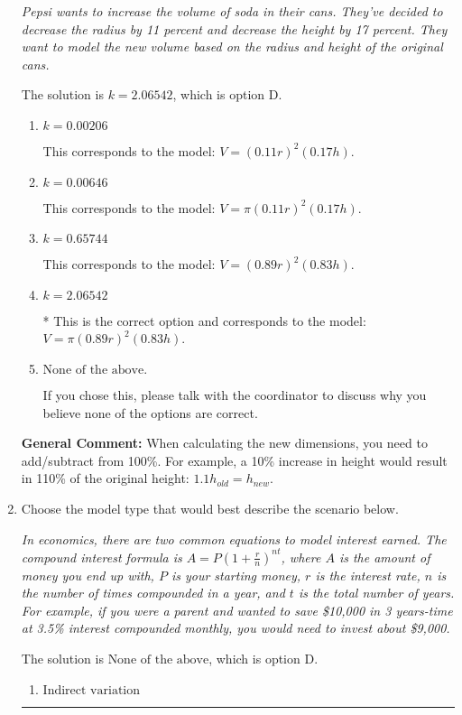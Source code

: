 \documentclass{extbook}[14pt]
\newcommand{\litem}[1]{\item #1

\rule{\textwidth}{0.4pt}}
\begin{document}
\begin{enumerate}
{\begin{center}
    \textit{ Pepsi wants to increase the volume of soda in their cans. They've decided to decrease the radius by 11 percent and decrease the height by 17 percent. They want to model the new volume based on the radius and height of the original cans. }
\end{center}
The solution is \( k = 2.06542 \), which is option D.\begin{enumerate}[label=\Alph*.]
\item \( k = 0.00206 \)

This corresponds to the model: $V = (0.11 r)^2 (0.17 h)$.
\item \( k = 0.00646 \)

This corresponds to the model: $V = \pi (0.11 r)^2 (0.17 h)$.
\item \( k = 0.65744 \)

This corresponds to the model: $V = (0.89 r)^2 (0.83 h)$.
\item \( k = 2.06542 \)

* This is the correct option and corresponds to the model: $V = \pi (0.89 r)^2 (0.83 h)$.
\item \( \text{None of the above.} \)

If you chose this, please talk with the coordinator to discuss why you believe none of the options are correct.
\end{enumerate}

\textbf{General Comment:} When calculating the new dimensions, you need to add/subtract from 100\%. For example, a 10\% increase in height would result in 110\% of the original height: $1.1h_{old} = h_{new}$.
}
\litem{
Choose the model type that would best describe the scenario below.

\begin{center}
    \textit{ In economics, there are two common equations to model interest earned. The compound interest formula is $A = P (1 + \frac{r}{n})^{nt}$, where $A$ is the amount of money you end up with, $P$ is your starting money, $r$ is the interest rate, $n$ is the number of times compounded in a year, and $t$ is the total number of years. For example, if you were a parent and wanted to save \$10,000 in 3 years-time at 3.5\% interest compounded monthly, you would need to invest about \$9,000. }
\end{center}
The solution is \( \text{None of the above} \), which is option D.\begin{enumerate}[label=\Alph*.]
\item \( \text{Indirect variation} \)



\end{enumerate}}
\end{enumerate}
\end{document}
